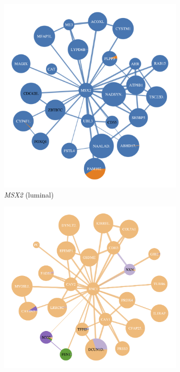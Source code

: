\begin{figure}[!t]
    \centering
    \begin{subfigure}[!t]{0.49\textwidth}
        \includegraphics[width=1.0\textwidth,height=1.0\textheight,keepaspectratio]{Sections/Network_I/Resources/selective_pruning/net/net_MSX2.png}
        \caption{\textit{MSX2} (luminal)}
        \label{fig:N_I:net_MSX2}
    \end{subfigure}
    \centering
    \begin{subfigure}[!t]{0.49\textwidth}
        \includegraphics[width=1.0\textwidth,height=1.0\textheight,keepaspectratio]{Sections/Network_I/Resources/selective_pruning/net/net_BNC1.png}

\end{subfigure}
\end{figure}
